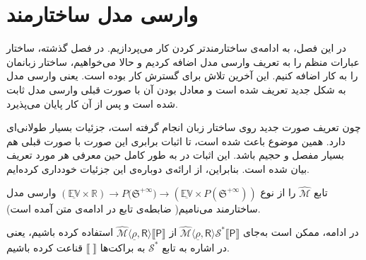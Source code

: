 \chapter{وارسی مدل ساختارمند}

در این فصل، به ادامه‌ی ساختارمندتر کردن کار می‌پردازیم. در فصل گذشته، ساختار عبارات منظم را به تعریف وارسی مدل اضافه کردیم و حالا می‌خواهیم، ساختار زبانمان را به کار اضافه کنیم. این آخرین تلاش \cite{calcul} برای گسترش کار بوده است. یعنی وارسی مدل به شکل جدید تعریف شده است و معادل بودن آن با صورت قبلی وارسی مدل ثابت شده است و پس از آن کار پایان می‌پذیرد. 

چون تعریف صورت جدید روی ساختار زبان انجام گرفته است، جزئیات بسیار طولانی‌ای دارد. همین موضوع باعث شده است، تا اثبات‌ برابری این صورت با صورت قبلی هم بسیار مفصل و حجیم باشد. این اثبات در \cite{calcul} به طور کامل حین معرفی هر مورد تعریف بیان شده است. بنابراین، از ارائه‌ی دوباره‌ی این جزئیات خودداری کرده‌ایم.

\begin{defn}
	
تابع
$\mathcal{\hat{M}}$
 را از نوع
 $\mathbb{(\underline{EV} \times R)} \rightarrow  \mathit{P}({\mathfrak{S}^{+\infty})}
\rightarrow ( \mathbb{\underline{EV}} \times \mathit{P}(\mathfrak{S}^{+\infty})) $
وارسی مدل ساختارمند می‌نامیم( ضابطه‌ی تابع در ادامه‌ی متن آمده است).
\end{defn}
در ادامه، ممکن است به‌جای 
$\mathcal{\hat{M}}\langle \underline{\rho}, \mathsf{R} \rangle \mathcal{S}^* \llbracket \mathsf{P} \rrbracket$
از 
$\mathcal{\hat{M}}\langle \underline{\rho}, \mathsf{R} \rangle \llbracket \mathsf{P} \rrbracket$
استفاده کرده باشیم، یعنی در اشاره به تابع $\mathcal{S}^*$ به براکت‌ها
$\llbracket \; \rrbracket$
قناعت کرده باشیم.



